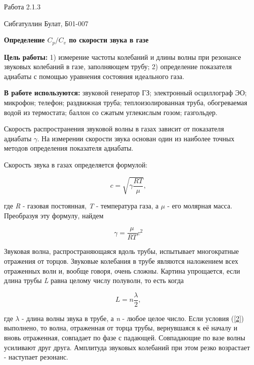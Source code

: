 \documentclass[12pt,a4paper]{article}
\begin{document}
\begin{center}
    \large
    Работа 2.1.3
    
    Сибгатуллин Булат, Б01-007
    
    \vspace{0.5cm}
    \textbf{Определение $C_p/C_v$ по скорости звука в газе}

\end{center}

\vspace{0.5cm}
\textbf{Цель работы:} 1) измерение частоты колебаний и длины волны при резонансе звуковых колебаний в газе, заполняющем трубу; 2) определение показателя адиабаты  с помощью уравнения состояния идеального газа.

\vspace{0.5cm}
\textbf{В работе используются:} звуковой генератор ГЗ; электронный осциллограф ЭО; микрофон; телефон; раздвижная труба; теплоизолированная труба, обогреваемая водой из термостата; баллон со сжатым углекислым гозом; газгольдер.

\vspace{0.5cm}

Скорость распространения звуковой волны в газах зависит от показателя адиабаты $\gamma$. На измерении скорости звука основан один из наиболее точных методов определения показателя адиабаты.

Скорость звука в газах определяется формулой:

\[c = \sqrt {\gamma \frac{RT}{\mu}},\]

где \textit{R} - газовая постоянная, \textit{T} - температура газа, а $\mu$ - его молярная масса. Преобразуя эту формулу, найдем

\begin{equation}\label{1}
\gamma = \frac{\mu}{RT} c^2
\end{equation}

Звуковая волна, распространяющаяся вдоль трубы, испытывает многократные отражения от торцов. Звуковые колебания в трубе являются наложением всех отраженных волн и, вообще говоря, очень сложны. Картина упрощается, если длина трубы \textit{L} равна целому числу полуволн, то есть когда

\begin{equation}\label{2}
L = n \frac{\lambda}{2},
\end{equation}

где $\lambda$ - длина волны звука в трубе, а \textit{n} - любое целое число. Если условия (\ref{2}) выполнено, то волна, отраженная от торца трубы, вернувшаяся к её началу и вновь отраженная, совпадает по фазе с падающей. Совпадающие по вазе волны усиливают друг друга. Амплитуда звуковых колебаний при этом резко возрастает - наступает резонанс.
\end{document}
